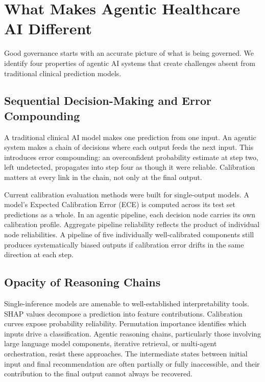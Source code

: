 \documentclass[12pt,a4paper]{article}
\begin{document}
\section*{What Makes Agentic Healthcare AI Different}

Good governance starts with an accurate picture of what is being
governed. We identify four properties of agentic AI systems that
create challenges absent from traditional clinical prediction
models.

\subsection*{Sequential Decision-Making and Error Compounding}

A traditional clinical AI model makes one prediction from one
input. An agentic system makes a chain of decisions where each
output feeds the next input. This introduces error compounding:
an overconfident probability estimate at step two, left
undetected, propagates into step four as though it were reliable.
Calibration matters at every link in the chain, not only at the
final output.

Current calibration evaluation methods were built for
single-output models. A model's Expected Calibration Error (ECE)
is computed across its test set predictions as a
whole.\cite{guo2017} In an agentic pipeline, each decision node
carries its own calibration profile. Aggregate pipeline
reliability reflects the product of individual node reliabilities.
A pipeline of five individually well-calibrated components still
produces systematically biased outputs if calibration error drifts
in the same direction at each step.\cite{angelopoulos2023}

\subsection*{Opacity of Reasoning Chains}

Single-inference models are amenable to well-established
interpretability tools. SHAP values decompose a prediction into
feature contributions. Calibration curves expose probability
reliability. Permutation importance identifies which inputs drive
a classification. Agentic reasoning chains, particularly those
involving large language model components, iterative retrieval,
or multi-agent orchestration, resist these approaches. The
intermediate states between initial input and final recommendation
are often partially or fully inaccessible, and their contribution
to the final output cannot always be recovered.
\end{document}
